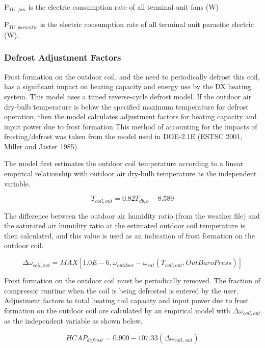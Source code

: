 P\(_{TU,fan}\) is the electric consumption rate of all terminal unit fans (W)

P\(_{TU,parasitic}\) is the electric consumption rate of all terminal unit parasitic electric (W).

\subsubsection{Defrost Adjustment Factors}\label{defrost-adjustment-factors}

Frost formation on the outdoor coil, and the need to periodically defrost this coil, has a significant impact on heating capacity and energy use by the DX heating system. This model uses a timed reverse-cycle defrost model. If the outdoor air dry-bulb temperature is below the specified maximum temperature for defrost operation, then the model calculates adjustment factors for heating capacity and input power due to frost formation This method of accounting for the impacts of frosting/defrost was taken from the model used in DOE-2.1E (ESTSC 2001, Miller and Jaster 1985).

The model first estimates the outdoor coil temperature according to a linear empirical relationship with outdoor air dry-bulb temperature as the independent variable.

\begin{equation}
  T_{coil,out} = 0.82 T_{db,o} - 8.589
\end{equation}

The difference between the outdoor air humidity ratio (from the weather file) and the saturated air humidity ratio at the estimated outdoor coil temperature is then calculated, and this value is used as an indication of frost formation on the outdoor coil.

\begin{equation}
  \Delta \omega_{coil,out} = MAX \left[ 1.0E - 6, \omega_{outdoor} - \omega_{sat} \left( T_{coil,out},OutBaroPress \right) \right]
\end{equation}

Frost formation on the outdoor coil must be periodically removed. The fraction of compressor runtime when the coil is being defrosted is entered by the user. Adjustment factors to total heating coil capacity and input power due to frost formation on the outdoor coil are calculated by an empirical model with \(\Delta \omega_{coil,out}\) as the independent variable as shown below.

\begin{equation}
  HCAP_{defrost} = 0.909 - 107.33 \left( \Delta \omega_{coil,\,out} \right)
\end{equation}

